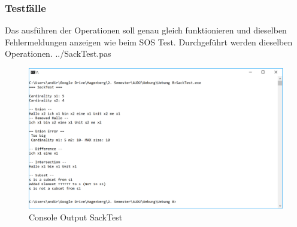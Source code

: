 \documentclass[a4papr,12pt]{article}
\begin{document}
\subsubsection*{Testfälle}
\raggedright
Das ausführen der Operationen soll genau gleich funktionieren und dieselben Fehlermeldungen anzeigen wie beim SOS Test. Durchgeführt werden dieselben Operationen.
\newline
 {../SackTest.pas}
\begin{figure}[H]
	\centering
	\includegraphics[scale=0.7]{./pictures/2.png}
	\caption{Console Output SackTest}
	\label{fig: ParserTest}
\end{figure}
\raggedright
\end{document}
